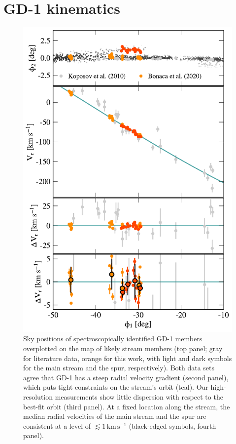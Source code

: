 \documentclass[twocolumn]{aastex63}
\newcommand{\kms}{\ensuremath{\textrm{km}\,\textrm{s}^{-1}}}
\begin{document}
\section{GD-1 kinematics}
\label{sec:kinematics}

\begin{figure}
\begin{center}
\includegraphics[width=0.99\columnwidth]{gd1_kinematics.pdf}
\end{center}
\caption{Sky positions of spectroscopically identified GD-1 members overplotted on the map of likely stream members (top panel; gray for literature data, orange for this work, with light and dark symbols for the main stream and the spur, respectively).
Both data sets agree that GD-1 has a steep radial velocity gradient (second panel), which puts tight constraints on the stream's orbit (teal).
Our high-resolution measurements show little dispersion with respect to the best-fit orbit (third panel).
At a fixed location along the stream, the median radial velocities of the main stream and the spur are consistent at a level of $\lesssim1\,\kms$ (black-edged symbols, fourth panel).
}
\label{fig:vr}
\end{figure}
\end{document}
